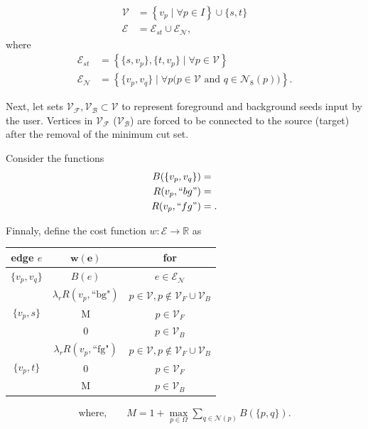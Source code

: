 \begin{align*}
	\mathcal{V} &= \left\{ v_p \; | \; \forall p \in I \right\} \cup \{s,t\}\\
	\mathcal{E} &= \mathcal{E}_{st} \cup \mathcal{E}_{\mathcal{N}},
\end{align*}
where 
\begin{align*}
\mathcal{E}_{st} &= \left\{ \{s,v_p\}, \{t,v_p\} \; | \; \forall p \in \mathcal{V}  \right\} \\
\mathcal{E}_{\mathcal{N}} &= \left\{ \{v_p,v_q\} \; | \; \forall p\big( p \in \mathcal{V} \text{ and } q\in \mathcal{N}_8(p) \big)  \right\}.
\end{align*}

Next, let sets $\mathcal{V_F}, \mathcal{V_B} \subset \mathcal{V}$ to represent foreground and background seeds input by the user. Vertices in $\mathcal{V_F}$ ($\mathcal{V_B}$) are forced to be connected to the source (target) after the removal of the minimum cut set.

Consider the functions
\begin{align*}
	B(\{v_p,v_q\}) &= \\
	R(v_p,``bg") &= \\
	R(v_p,``fg") &= .
\end{align*}

Finnaly, define the cost function $w:\mathcal{E}\rightarrow \mathbb{R}$ as

\begin{table}[H]
\centering
\setlength{\extrarowheight}{0.75em}
\begin{tabular}{|c|c|c|}
\hline
\textbf{edge} $e$ & $\mathbf{w(e)}$ & \textbf{for}\\
\hline
$\{v_p, v_q\}$ & $B(e)$ & $e \in \mathcal{E}_{\mathcal{N}}$\\
\hline
\multirow{3}{*}{$\{v_p, s\}$} & $\lambda_r R(v_p,\text{``bg"})$ & $p \in \mathcal{\mathcal{V}}, p \notin \mathcal{\mathcal{V}}_F \cup \mathcal{\mathcal{V}}_B$\\
& M & $p \in \mathcal{\mathcal{V}}_F$ \\
& 0 & $p \in \mathcal{\mathcal{V}}_B$ \\
\hline
\multirow{3}{*}{$\{v_p, t\}$} & $\lambda_r R(v_p,\text{``fg"})$ & $p \in \mathcal{\mathcal{V}}, p \notin \mathcal{\mathcal{V}}_F \cup \mathcal{\mathcal{V}}_B$\\
& 0 & $p \in \mathcal{\mathcal{V}}_F$ \\
& M & $p \in \mathcal{\mathcal{V}}_B$ \\
\hline
\end{tabular}
\begin{align*}
\text{where,} \qquad M = 1 + \max_{p \in \Omega}{\sum_{q \in \mathcal{N}(p)}}{B(\{p,q\})}.
\end{align*}
\end{table}


